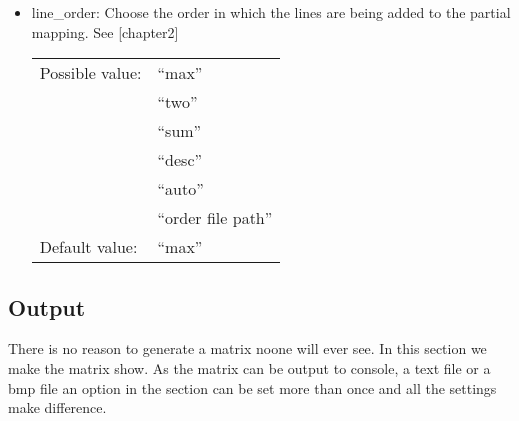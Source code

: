 \begin{itemize}
\item line\_order: Choose the order in which the lines are being added to the partial mapping. See [chapter2]

\begin{tabular}{ll}
Possible value: & ``max'' \\
& ``two'' \\
& ``sum'' \\
& ``desc'' \\
& ``auto'' \\
& ``order file path'' \\
Default value: & ``max''
\end{tabular}

\end{itemize}
\subsection{Output}
There is no reason to generate a matrix noone will ever see. In this section we make the matrix show. As the matrix can be output to console, a text file or a bmp file an option in the section can be set more than once and all the settings make difference.
